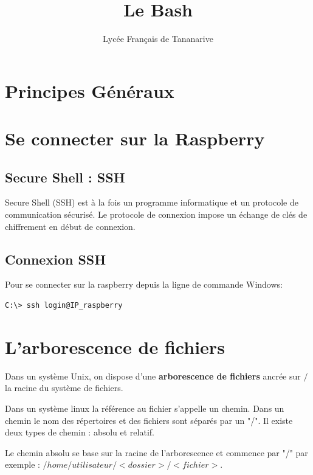 \documentclass[a4paper,10pt]{article}
\title{Le Bash}
\author{Lycée Français de Tananarive}
\date{}
\begin{document}
	\maketitle
	\thispagestyle{fancy}
\section{Principes Généraux}

\noindent{}
\section{Se connecter sur la Raspberry}
	\subsection{Secure Shell : SSH}
	\setlength{\parindent}{8ex}Secure Shell (SSH) est à la fois un programme informatique et un protocole de communication sécurisé. Le protocole de connexion impose un échange de clés de chiffrement en début de connexion.
	\subsection{Connexion SSH}
	Pour se connecter sur la raspberry depuis la ligne de commande Windows:
	\begin{lstlisting}[language=sh, frame = single]
	C:\> ssh login@IP_raspberry
	\end{lstlisting}
\section{L'arborescence de fichiers}
\setlength{\parindent}{8ex}Dans un système Unix, on dispose d'une \textbf{arborescence de fichiers} ancrée sur $/$ la racine du système de fichiers.

Dans un système linux la référence au fichier s'appelle un chemin. Dans un chemin le nom des répertoires et des fichiers sont séparés par un "/". Il existe deux types de chemin : absolu et relatif.

Le chemin absolu se base sur la racine de l'arborescence et commence par "/" par exemple :
\newline $/home/utilisateur/<dossier>/<fichier>$.
\end{document}

